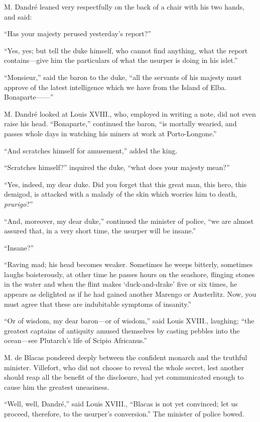 M. Dandré leaned very respectfully on the back of a chair with his two
hands, and said:

“Has your majesty perused yesterday’s report?”

“Yes, yes; but tell the duke himself, who cannot find anything, what
the report contains—give him the particulars of what the usurper is
doing in his islet.”

“Monsieur,” said the baron to the duke, “all the servants of his
majesty must approve of the latest intelligence which we have from the
Island of Elba. Bonaparte——”

M. Dandré looked at Louis XVIII., who, employed in writing a note, did
not even raise his head. “Bonaparte,” continued the baron, “is mortally
wearied, and passes whole days in watching his miners at work at
Porto-Longone.”

“And scratches himself for amusement,” added the king.

“Scratches himself?” inquired the duke, “what does your majesty mean?”

“Yes, indeed, my dear duke. Did you forget that this great man, this
hero, this demigod, is attacked with a malady of the skin which worries
him to death, \textit{prurigo}?”

“And, moreover, my dear duke,” continued the minister of police, “we
are almost assured that, in a very short time, the usurper will be
insane.”

“Insane?”

“Raving mad; his head becomes weaker. Sometimes he weeps bitterly,
sometimes laughs boisterously, at other time he passes hours on the
seashore, flinging stones in the water and when the flint makes
‘duck-and-drake’ five or six times, he appears as delighted as if he
had gained another Marengo or Austerlitz. Now, you must agree that
these are indubitable symptoms of insanity.”

“Or of wisdom, my dear baron—or of wisdom,” said Louis XVIII.,
laughing; “the greatest captains of antiquity amused themselves by
casting pebbles into the ocean—see Plutarch’s life of Scipio
Africanus.”

M. de Blacas pondered deeply between the confident monarch and the
truthful minister. Villefort, who did not choose to reveal the whole
secret, lest another should reap all the benefit of the disclosure, had
yet communicated enough to cause him the greatest uneasiness.

“Well, well, Dandré,” said Louis XVIII., “Blacas is not yet convinced;
let us proceed, therefore, to the usurper’s conversion.” The minister
of police bowed.

